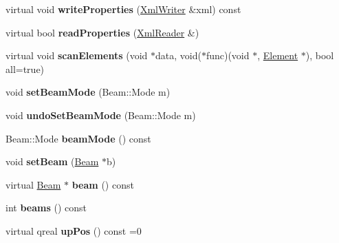 \begin{DoxyCompactItemize}
virtual void {\bfseries write\+Properties} (\hyperlink{class_ms_1_1_xml_writer}{Xml\+Writer} \&xml) const
\item 
\mbox{\label{class_ms_1_1_chord_rest_aa8d9ee5c08abea6855480d2f208a0c80}} 
virtual bool {\bfseries read\+Properties} (\hyperlink{class_ms_1_1_xml_reader}{Xml\+Reader} \&)
\item 
\mbox{\label{class_ms_1_1_chord_rest_a8136bb4d1225d3dc2607a37aa4908b76}} 
virtual void {\bfseries scan\+Elements} (void $\ast$data, void($\ast$func)(void $\ast$, \hyperlink{class_ms_1_1_element}{Element} $\ast$), bool all=true)
\item 
\mbox{\label{class_ms_1_1_chord_rest_aabe820028e32de9fe986327e1171d280}} 
void {\bfseries set\+Beam\+Mode} (Beam\+::\+Mode m)
\item 
\mbox{\label{class_ms_1_1_chord_rest_a5131545de9bbbd2283e7ba3b1a9336db}} 
void {\bfseries undo\+Set\+Beam\+Mode} (Beam\+::\+Mode m)
\item 
\mbox{\label{class_ms_1_1_chord_rest_a9103d7e3ecf91f604d7bfd8a529ef09d}} 
Beam\+::\+Mode {\bfseries beam\+Mode} () const
\item 
\mbox{\label{class_ms_1_1_chord_rest_a45806d334456a727534f339e2650ac25}} 
void {\bfseries set\+Beam} (\hyperlink{class_ms_1_1_beam}{Beam} $\ast$b)
\item 
\mbox{\label{class_ms_1_1_chord_rest_a75babda8fd88cfe0b18e11aa516c2fd5}} 
virtual \hyperlink{class_ms_1_1_beam}{Beam} $\ast$ {\bfseries beam} () const
\item 
\mbox{\label{class_ms_1_1_chord_rest_a2f39b6dcebfe8d621c3ac82cbce6a159}} 
int {\bfseries beams} () const
\item 
\mbox{\label{class_ms_1_1_chord_rest_a6b732ed12dcb42e11692520fc040ad49}} 
virtual qreal {\bfseries up\+Pos} () const =0
\item 
\mbox{\label{class_ms_1_1_chord_rest_abe43602b2fd35f8301a6845f10320fef}} 

\end{DoxyCompactItemize}
